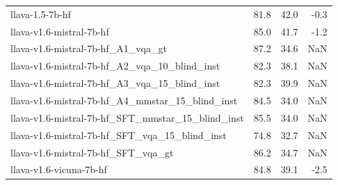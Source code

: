 \begin{tabular}{lrrr}
llava-1.5-7b-hf & 81.8 & 42.0 & -0.3 \\
llava-v1.6-mistral-7b-hf & 85.0 & 41.7 & -1.2 \\
llava-v1.6-mistral-7b-hf_A1_vqa_gt & 87.2 & 34.6 & NaN \\
llava-v1.6-mistral-7b-hf_A2_vqa_10_blind_inst & 82.3 & 38.1 & NaN \\
llava-v1.6-mistral-7b-hf_A3_vqa_15_blind_inst & 82.3 & 39.9 & NaN \\
llava-v1.6-mistral-7b-hf_A4_mmstar_15_blind_inst & 84.5 & 34.0 & NaN \\
llava-v1.6-mistral-7b-hf_SFT_mmstar_15_blind_inst & 85.5 & 34.0 & NaN \\
llava-v1.6-mistral-7b-hf_SFT_vqa_15_blind_inst & 74.8 & 32.7 & NaN \\
llava-v1.6-mistral-7b-hf_SFT_vqa_gt & 86.2 & 34.7 & NaN \\
llava-v1.6-vicuna-7b-hf & 84.8 & 39.1 & -2.5 \\
\bottomrule
\end{tabular}
